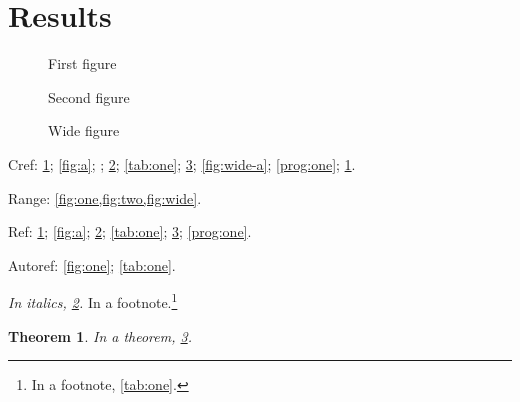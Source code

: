 \documentclass{article}
\newtheorem{theorem}{Theorem}
\begin{document}
\section{Results}\label{sec:res}
\begin{figure}[h]
  \centering
  \quad
  \caption{First figure}\label{fig:one}
\end{figure}
\begin{figure}[h]
  \centering
  \captionsetup{name=Fig.}
  \caption{Second figure}\label{fig:two}
\end{figure}
\begin{table}[h]
  \centering
  \caption{First table}\label{tab:one}
  \quad
\end{table}
\begin{figure}[h]
  \centering
  \caption{Wide figure}\label{fig:wide}
\end{figure}
\begin{program}[h]
  \caption{A program}\label{prog:one}
\end{program}

Cref: \cref{fig:one}; \cref{fig:a}; ; \cref{fig:two}; \cref{tab:one}; \cref{fig:wide}; \cref{fig:wide-a}; \cref{prog:one}; \cref{sec:res}.

Range: \cref{fig:one,fig:two,fig:wide}.

Ref: \ref{fig:one}; \ref{fig:a}; \ref{fig:two}; \ref{tab:one}; \ref{fig:wide}; \ref{prog:one}.

Autoref: \autoref{fig:one}; \autoref{tab:one}.

\emph{In italics, \cref{fig:two}.} In a footnote.\footnote{In a footnote, \cref{tab:one}.}

\begin{theorem}
In a theorem, \cref{fig:wide}.
\end{theorem}
\end{document}
